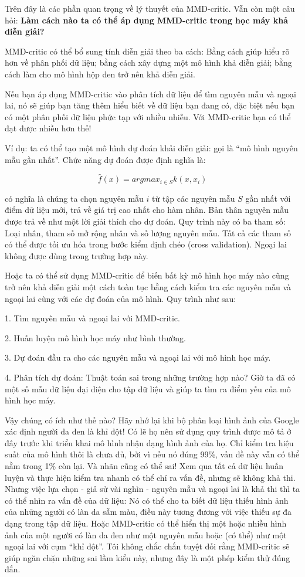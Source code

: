 Trên đây là các phần quan trọng về lý thuyết của MMD-critic. Vẫn còn một câu hỏi: \textbf{Làm cách nào ta có thể áp dụng MMD-critic trong học máy khả diễn giải?}

MMD-critic có thể bổ sung tính diễn giải theo ba cách: Bằng cách giúp hiểu rõ hơn về phân phối dữ liệu; bằng cách xây dựng một mô hình khả diễn giải; bằng cách làm cho mô hình hộp đen trở nên khả diễn giải.

Nếu bạn áp dụng MMD-critic vào phân tích dữ liệu để tìm nguyên mẫu và ngoại lai, nó sẽ giúp bạn tăng thêm hiểu biết về dữ liệu bạn đang có, đặc biệt nếu bạn có một phân phối dữ liệu phức tạp với nhiều nhiễu. Với MMD-critic bạn có thể đạt được nhiều hơn thế!

Ví dụ: ta có thể tạo một mô hình dự đoán khải diễn giải: gọi là ``mô hình nguyên mẫu gần nhất''. Chức năng dự đoán được định nghĩa là:

$$\hat{f}(x)=argmax_{i\in{}S}k(x,x_i)$$

có nghĩa là chúng ta chọn nguyên mẫu $i$ từ tập các nguyên mẫu $S$ gần nhất với điểm dữ liệu mới, trả về giá trị cao nhất cho hàm nhân. Bản thân nguyên mẫu được trả về như một lời giải thích cho dự đoán. Quy trình này có ba tham số: Loại nhân, tham số mở rộng nhân và số lượng nguyên mẫu. Tất cả các tham số có thể được tối ưu hóa trong bước kiểm định chéo (cross validation). Ngoại lai không được dùng trong trường hợp này.

Hoặc ta có thể sử dụng MMD-critic để biến bất kỳ mô hình học máy nào cũng trở nên khả diễn giải một cách toàn tục bằng cách kiểm tra các nguyên mẫu và ngoại lai cùng với các dự đoán của mô hình. Quy trình như sau:

1. Tìm nguyên mẫu và ngoại lai với MMD-critic.

2. Huấn luyện mô hình học máy như bình thường.

3. Dự đoán đầu ra cho các nguyên mẫu và ngoại lai với mô hình học máy.

4. Phân tích dự đoán: Thuật toán sai trong những trường hợp nào? Giờ ta đã có một số mẫu dữ liệu đại diện cho tập dữ liệu và giúp ta tìm ra điểm yếu của mô hình học máy.

Vậy chúng có ích như thế nào? Hãy nhớ lại khi bộ phân loại hình ảnh của Google xác định người da đen là khỉ đột! Có lẽ họ nên sử dụng quy trình được mô tả ở đây trước khi triển khai mô hình nhận dạng hình ảnh của họ. Chỉ kiểm tra hiệu suất của mô hình thôi là chưa đủ, bởi vì nếu nó đúng 99\%, vấn đề này vẫn có thể nằm trong 1\% còn lại. Và nhãn cũng có thể sai! Xem qua tất cả dữ liệu huấn luyện và thực hiện kiểm tra nhanh có thể chỉ ra vấn đề, nhưng sẽ không khả thi. Nhưng việc lựa chọn - giả sử vài nghìn - nguyên mẫu và ngoại lai là khả thi thì ta có thể nhìn ra vấn đề của dữ liệu: Nó có thể cho ta biết dữ liệu thiếu hình ảnh của những người có làn da sẫm màu, điều này tương đương với việc thiếu sự đa dạng trong tập dữ liệu. Hoặc MMD-critic có thể hiển thị một hoặc nhiều hình ảnh của một người có làn da đen như một nguyên mẫu hoặc (có thể) như một ngoại lai với cụm ``khỉ đột''. Tôi không chắc chắn tuyệt đối rằng MMD-critic sẽ giúp ngăn chặn những sai lầm kiểu này, nhưng đây là một phép kiểm thử đúng đắn.

